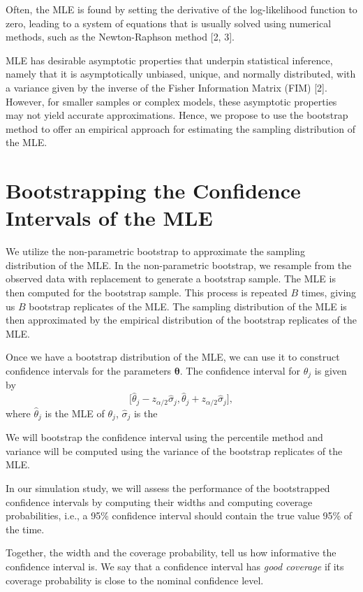 \documentclass[
]{article}
\begin{document}
Often, the MLE is found by setting the derivative of the log-likelihood
function to zero, leading to a system of equations that is usually
solved using numerical methods, such as the Newton-Raphson method {[}2,
3{]}.

MLE has desirable asymptotic properties that underpin statistical
inference, namely that it is asymptotically unbiased, unique, and
normally distributed, with a variance given by the inverse of the Fisher
Information Matrix (FIM) {[}2{]}. However, for smaller samples or
complex models, these asymptotic properties may not yield accurate
approximations. Hence, we propose to use the bootstrap method to offer
an empirical approach for estimating the sampling distribution of the
MLE.

\hypertarget{sec:boot}{%
\section{Bootstrapping the Confidence Intervals of the
MLE}\label{sec:boot}}

We utilize the non-parametric bootstrap to approximate the sampling
distribution of the MLE. In the non-parametric bootstrap, we resample
from the observed data with replacement to generate a bootstrap sample.
The MLE is then computed for the bootstrap sample. This process is
repeated \(B\) times, giving us \(B\) bootstrap replicates of the MLE.
The sampling distribution of the MLE is then approximated by the
empirical distribution of the bootstrap replicates of the MLE.

Once we have a bootstrap distribution of the MLE, we can use it to
construct confidence intervals for the parameters
\(\boldsymbol{\theta}\). The confidence interval for \(\theta_j\) is
given by \[
\bigl[\hat{\theta}_j - z_{\alpha/2} \hat{\sigma}_j, \hat{\theta}_j + z_{\alpha/2} \hat{\sigma}_j\bigr],
\] where \(\hat{\theta}_j\) is the MLE of \(\theta_j\),
\(\hat{\sigma}_j\) is the

We will bootstrap the confidence interval using the percentile method
and variance will be computed using the variance of the bootstrap
replicates of the MLE.

In our simulation study, we will assess the performance of the
bootstrapped confidence intervals by computing their widths and
computing coverage probabilities, i.e., a 95\% confidence interval
should contain the true value 95\% of the time.

Together, the width and the coverage probability, tell us how
informative the confidence interval is. We say that a confidence
interval has \emph{good coverage} if its coverage probability is close
to the nominal confidence level.
\end{document}

